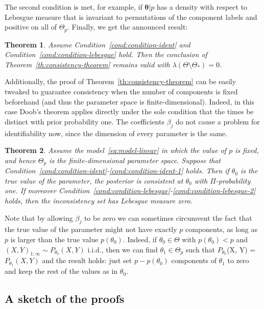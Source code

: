 \documentclass{article}
\numberwithin{equation}{section}
\theoremstyle{plain}
\newtheorem{theorem}{Theorem}[section]
\begin{document}
The second condition is met, for example, if \(\bm \theta|p\) has a density with respect to Lebesgue measure that is invariant to permutations of the component labels and positive on all of \(\Theta_p\). Finally, we get the announced result:

\begin{theorem}\label{th:consistency-theorem-2}
  Assume Condition~\ref{cond:condition-ident} and Condition~\ref{cond:condition-lebesgue} hold. Then the conclusion of Theorem~\ref{th:consistency-theorem} remains valid with \(\lambda(\Theta \setminus \Theta_*)=0\).
\end{theorem}

Additionally, the proof of Theorem~\ref{th:consistency-theorem} can be easily tweaked to guarantee consistency when the number of components is fixed beforehand (and thus the parameter space is finite-dimensional). Indeed, in this case Doob's theorem applies directly under the sole condition that the times be distinct with prior probability one. The coefficients \(\beta_j\) do not cause a problem for identifiability now, since the dimension of every parameter is the same.

\begin{theorem}
  Assume the model~\eqref{eq:model-linear} in which the value of \(p\) is fixed, and hence \(\Theta_p\) is the finite-dimensional parameter space. Suppose that Condition~\ref{cond:condition-ident}-\ref{cond:condition-ident-1} holds. Then if \(\theta_0\) is the true value of the parameter, the posterior is consistent at \(\theta_0\) with \(\Pi\)-probability one. If moreover Condition~\ref{cond:condition-lebesgue}-\ref{cond:condition-lebesgue-2} holds, then the inconsistency set has Lebesgue measure zero.
\end{theorem}

Note that by allowing \(\beta_j\) to be zero we can sometimes circumvent the fact that the true value of the parameter might not have exactly \(p\) components, as long as \(p\) is larger than the true value \(p(\theta_0)\). Indeed, if \(\theta_0\in\Theta\) with \(p(\theta_0) < p\) and \((X,Y)_{1:\infty} \sim P_{\theta_0}(X,Y)\) i.i.d., then we can find \(\theta_1\in\Theta_p\) such that \(P_{\theta_0}\)(X, Y) = \(P_{\theta_1}(X,Y)\) and the result holds: just set \(p - p(\theta_0)\) components of \(\theta_1\) to zero and keep the rest of the values as in \(\theta_0\).

\subsection{A sketch of the proofs}
\end{document}
